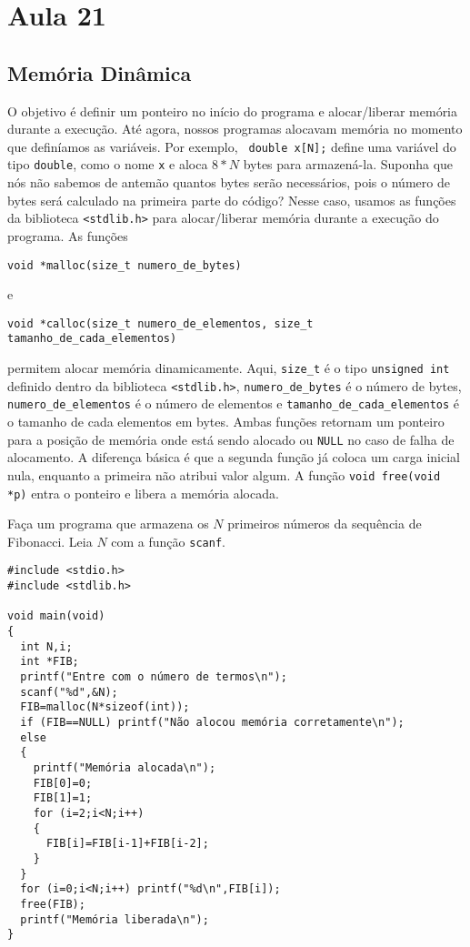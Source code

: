 

\chapter{Aula 21}
\section{Memória Dinâmica}
O objetivo é definir um ponteiro no início do programa e alocar/liberar memória durante a execução. Até agora, nossos programas alocavam memória no momento que definíamos as variáveis. Por exemplo, \verb| double x[N];| define uma variável do tipo \verb|double|, como o nome \verb|x| e aloca $8*N$ bytes para armazená-la. Suponha que nós não sabemos de antemão quantos bytes serão necessários, pois o número de bytes será calculado na primeira parte do código? Nesse caso, usamos as funções da biblioteca \verb|<stdlib.h>| para alocar/liberar memória durante a execução do programa. As funções
\begin{verbatim}
void *malloc(size_t numero_de_bytes)
\end{verbatim}
e
\begin{verbatim}
void *calloc(size_t numero_de_elementos, size_t tamanho_de_cada_elementos)
\end{verbatim}
permitem alocar memória dinamicamente. Aqui, \verb|size_t| é o tipo \verb|unsigned int| definido dentro da biblioteca \verb|<stdlib.h>|, \verb|numero_de_bytes| é o número de bytes, \verb|numero_de_elementos| é o número de elementos e \verb|tamanho_de_cada_elementos| é o tamanho de cada elementos em bytes. Ambas funções retornam um ponteiro para a posição de memória onde está sendo alocado ou \verb|NULL| no caso de falha de alocamento. A diferença básica é que a segunda função já coloca um carga inicial nula, enquanto a primeira não atribui valor algum. A função \verb|void free(void *p)| entra o ponteiro e libera a memória alocada.
\begin{ex}
Faça um programa que armazena os $N$ primeiros números da sequência de Fibonacci. Leia $N$ com a função \verb|scanf|.
\end{ex}
\begin{verbatim}
#include <stdio.h>
#include <stdlib.h>

void main(void)
{
  int N,i;
  int *FIB;
  printf("Entre com o número de termos\n");
  scanf("%d",&N);
  FIB=malloc(N*sizeof(int));
  if (FIB==NULL) printf("Não alocou memória corretamente\n");
  else
  {
    printf("Memória alocada\n");
    FIB[0]=0;
    FIB[1]=1;
    for (i=2;i<N;i++)
    {
      FIB[i]=FIB[i-1]+FIB[i-2];
    }
  }
  for (i=0;i<N;i++) printf("%d\n",FIB[i]);
  free(FIB);
  printf("Memória liberada\n");
}
\end{verbatim}

